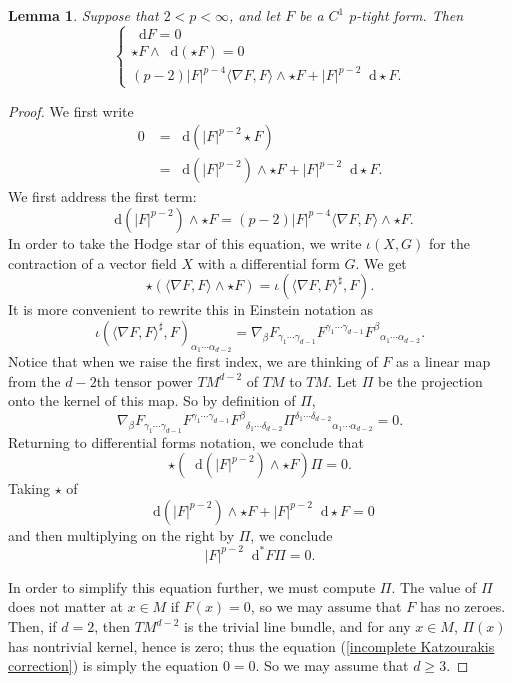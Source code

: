 \documentclass[reqno,11pt]{amsart}
\newcommand*\dif{\mathop{}\!\mathrm{d}}
\newtheorem{lemma}[theorem]{Lemma}
\theoremstyle{definition}
\numberwithin{equation}{section}
\begin{document}
\begin{lemma}
Suppose that $2 < p < \infty$, and let $F$ be a $C^1$ $p$-tight form.
Then
\begin{equation}\label{pMax nondivergence}
\begin{cases}
    \dif F = 0 \\
    \star F \wedge \dif(\star F) = 0 \\
    (p - 2) |F|^{p - 4} \langle \nabla F, F\rangle \wedge \star F + |F|^{p - 2} \dif \star F.
\end{cases}
\end{equation}
\end{lemma}
\begin{proof}
We first write 
\begin{align*} 
0 
&= \dif(|F|^{p - 2} \star F) \\
&= \dif(|F|^{p - 2}) \wedge \star F + |F|^{p - 2} \dif \star F.
\end{align*}
We first address the first term:
$$\dif(|F|^{p - 2}) \wedge \star F = (p - 2) |F|^{p - 4} \langle \nabla F, F\rangle \wedge \star F.$$
In order to take the Hodge star of this equation, we write $\iota(X, G)$ for the contraction of a vector field $X$ with a differential form $G$.
We get 
$$\star(\langle \nabla F, F\rangle \wedge \star F) = \iota(\langle \nabla F, F\rangle^\sharp, F).$$
It is more convenient to rewrite this in Einstein notation as 
$$\iota(\langle \nabla F, F\rangle^\sharp, F)_{\alpha_1 \cdots \alpha_{d - 2}} = \nabla_\beta F_{\gamma_1 \cdots \gamma_{d - 1}} F^{\gamma_1 \cdots \gamma_{d - 1}} {F^\beta}_{\alpha_1 \cdots \alpha_{d - 2}}.$$
Notice that when we raise the first index, we are thinking of $F$ as a linear map from the $d - 2$th tensor power $TM^{d - 2}$ of $TM$ to $TM$.
Let $\Pi$ be the projection onto the kernel of this map.
So by definition of $\Pi$,
$$\nabla_\beta F_{\gamma_1 \cdots \gamma_{d - 1}} F^{\gamma_1 \cdots \gamma_{d - 1}} {F^\beta}_{\delta_1 \cdots \delta_{d - 2}} {\Pi^{\delta_1 \cdots \delta_{d - 2}}}_{\alpha_1 \cdots \alpha_{d - 2}} = 0.$$
Returning to differential forms notation, we conclude that
$$\star(\dif(|F|^{p - 2}) \wedge \star F) \Pi = 0.$$
Taking $\star$ of 
$$\dif(|F|^{p - 2}) \wedge \star F + |F|^{p - 2} \dif \star F = 0$$
and then multiplying on the right by $\Pi$, we conclude 
\begin{equation}\label{incomplete Katzourakis correction}
|F|^{p - 2} \dif^* F \Pi = 0.
\end{equation}

In order to simplify this equation further, we must compute $\Pi$.
The value of $\Pi$ does not matter at $x \in M$ if $F(x) = 0$, so we may assume that $F$ has no zeroes.
Then, if $d = 2$, then $TM^{d - 2}$ is the trivial line bundle, and for any $x \in M$, $\Pi(x)$ has nontrivial kernel, hence is zero; thus the equation (\ref{incomplete Katzourakis correction}) is simply the equation $0 = 0$.
So we may assume that $d \geq 3$.


\end{proof}
\end{document}
